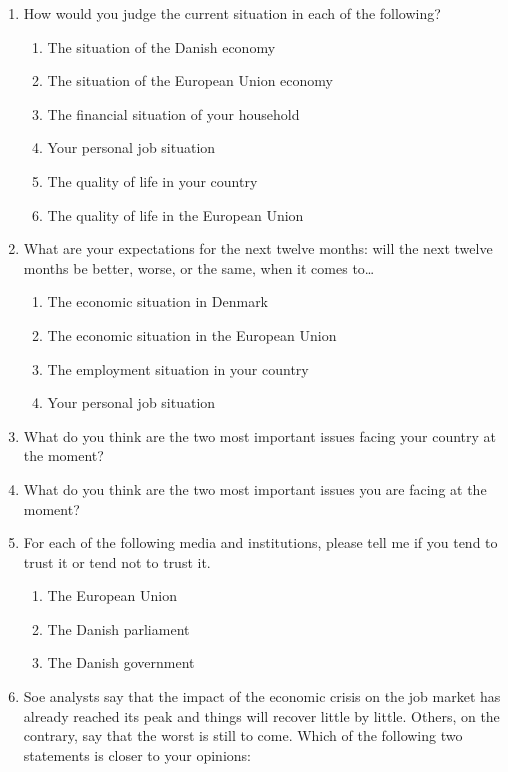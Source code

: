 \documentclass[12pt, a4]{article}
\begin{document}
\singlespacing

\begin{enumerate}\itemsep1.5em
	\item How would you judge the current situation in each of the following?
	\begin{enumerate}
		\item The situation of the Danish economy
		\item The situation of the European Union economy
		\item The financial situation of your household
		\item Your personal job situation
		\item The quality of life in your country
		\item The quality of life in the European Union
	\end{enumerate}
	\item What are your expectations for the next twelve months: will the next twelve months be better, worse, or the same, when it comes to\dots
		\begin{enumerate}
			\item The economic situation in Denmark
			\item The economic situation in the European Union
			\item The employment situation in your country
			\item Your personal job situation
		\end{enumerate}
	\item What do you think are the two most important issues facing your country at the moment?
	\item What do you think are the two most important issues you are facing at the moment?
	\item For each of the following media and institutions, please tell me if you tend to trust it or tend not to trust it.
		\begin{enumerate}
			\item The European Union
			\item The Danish parliament
			\item The Danish government
		\end{enumerate}
	\item Soe analysts say that the impact of the economic crisis on the job market has already reached its peak and things will recover little by little. Others, on the contrary, say that the worst is still to come. Which of the following two statements is closer to your opinions:
		\begin{enumerate}

\end{enumerate}
\end{enumerate}
\end{document}
